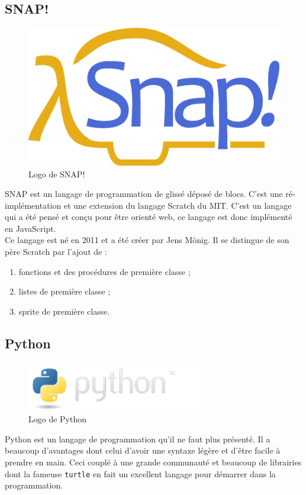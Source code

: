 \subsection{SNAP!}
\begin{figure}[!h]
  \begin{center}
    \includegraphics[scale=0.07]{content/5-related_work/images/snap}
    \caption{Logo de SNAP!}
    \label{fig:snap}
  \end{center}
\end{figure}
SNAP est un langage de programmation de glissé déposé de blocs. C'est une ré-implémentation et une extension du langage Scratch du MIT. C'est un langage qui a été pensé et conçu pour être orienté web, ce langage est donc implémenté en JavaScript.\\

Ce langage est né en 2011 et a été créer par Jens Mönig. Il se distingue de son père Scratch par l'ajout de :
\begin{enumerate}
\item fonctions et des procédures de première classe ;
\item listes de première classe ;
\item sprite de première classe.
\end{enumerate}

\subsection{Python}
\begin{figure}[!h]
  \begin{center}
    \includegraphics[scale=0.4]{content/5-related_work/images/python}
    \caption{Logo de Python}
    \label{fig:python}
  \end{center}
\end{figure}
Python est un langage de programmation qu'il ne faut plus présenté. Il a beaucoup d'avantages dont celui d'avoir une syntaxe légère et d'être facile à prendre en main. Ceci couplé à une grande communauté et beaucoup de librairies dont la fameuse \texttt{turtle} en fait un excellent langage pour démarrer dans la programmation.

